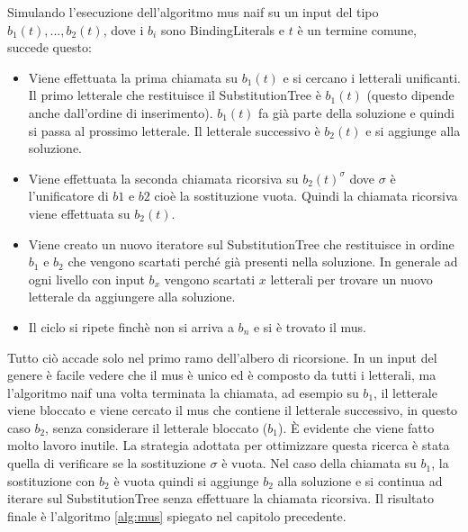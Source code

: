 \documentclass[./main.tex]{subfiles}
\begin{document}
Simulando l'esecuzione dell'algoritmo mus naif su un input del tipo $b_1(t), ..., b_2(t)$, dove i 
$b_i$ sono BindingLiterals e $t$ è un termine comune, succede questo:
\begin{itemize}
    \item Viene effettuata la prima chiamata su $b_1(t)$ e si cercano i letterali unificanti.
    Il primo letterale che restituisce il SubstitutionTree è $b_1(t)$ (questo dipende anche dall'ordine di inserimento).
    $b_1(t)$ fa già parte della soluzione e quindi si passa al prossimo letterale.
    Il letterale successivo è $b_2(t)$ e si aggiunge alla soluzione.
    \item Viene effettuata la seconda chiamata ricorsiva su $b_2(t)^\sigma$ dove $\sigma$ è l'unificatore
    di $b1$ e $b2$ cioè la sostituzione vuota. Quindi la chiamata ricorsiva viene effettuata su $b_2(t)$.
    \item Viene creato un nuovo iteratore sul SubstitutionTree che restituisce in ordine 
    $b_1$ e $b_2$ che vengono scartati perché già presenti nella soluzione.
    In generale ad ogni livello con input $b_x$ vengono scartati $x$ letterali per trovare un nuovo
    letterale da aggiungere alla soluzione.
    \item Il ciclo si ripete finchè non si arriva a $b_n$ e si è trovato il mus.
\end{itemize}
Tutto ciò accade solo nel primo ramo dell'albero di ricorsione.
In un input del genere è facile vedere che il mus è unico ed è composto da tutti i letterali,
ma l'algoritmo naif una volta terminata la chiamata, ad esempio su $b_1$, il letterale viene bloccato
e viene cercato il mus che contiene il letterale successivo, in questo caso $b_2$, senza considerare il letterale bloccato ($b_1$).
È evidente che viene fatto molto lavoro inutile.
La strategia adottata per ottimizzare questa ricerca è stata quella di verificare se la sostituzione $\sigma$ è vuota.
Nel caso della chiamata su $b_1$, la sostituzione con $b_2$ è vuota quindi si aggiunge $b_2$ alla soluzione e si 
continua ad iterare sul SubstitutionTree senza effettuare la chiamata ricorsiva.
Il risultato finale è l'algoritmo \ref{alg:mus} spiegato nel capitolo precedente.
\end{document}
